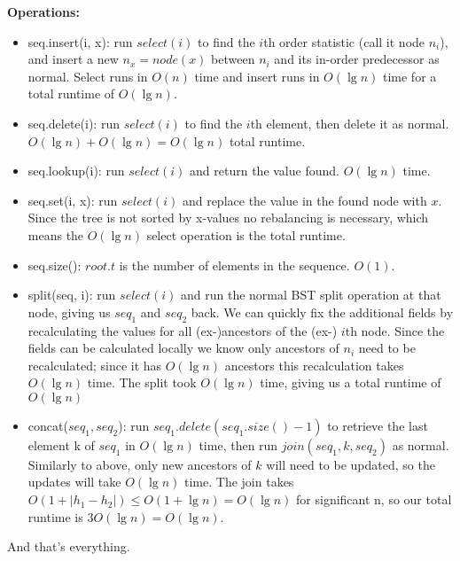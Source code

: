 \documentclass{article}
\renewcommand{\b}[1]{\textbf{#1}}
\begin{document}
\b{Operations:}
\begin{itemize}
  \item seq.insert(i, x): run $select(i)$ to find the $i$th order statistic (call it node $n_i$), and insert a new $n_x = node(x)$ between $n_i$ and its in-order predecessor as normal. Select runs in $O(n)$ time and insert runs in $O(\lg n)$ time for a total runtime of $O(\lg n)$.
  \item seq.delete(i): run $select(i)$ to find the $i$th element, then delete it as normal. $O(\lg n) + O(\lg n) = O(\lg n)$ total runtime.
  \item seq.lookup(i): run $select(i)$ and return the value found. $O(\lg n)$ time.
  \item seq.set(i, x): run $select(i)$ and replace the value in the found node with $x$. Since the tree is not sorted by x-values no rebalancing is necessary, which means the $O(\lg n)$ select operation is the total runtime.
  \item seq.size(): $root.t$ is the number of elements in the sequence. $O(1)$.
  \item split(seq, i): run $select(i)$ and run the normal BST split operation at that node, giving us $seq_1$ and $seq_2$ back. We can quickly fix the additional fields by recalculating the values for all (ex-)ancestors of the (ex-) $i$th node. Since the fields can be calculated locally we know only ancestors of $n_i$ need to be recalculated; since it has $O(\lg n)$ ancestors this recalculation takes $O(\lg n)$ time. The split took $O(\lg n)$ time, giving us a total runtime of $O(\lg n)$
  \item concat($seq_1, seq_2$): run $seq_1.delete(seq_1.size() - 1)$ to retrieve the last element k of $seq_1$ in $O(\lg n)$ time, then run $join(seq_1, k, seq_2)$ as normal. Similarly to above, only new ancestors of $k$ will need to be updated, so the updates will take $O(\lg n)$ time. The join takes $O(1 + |h_1 - h_2|) \le O(1 + \lg n) = O(\lg n)$ for significant n, so our total runtime is $3O(\lg n) = O(\lg n)$.
\end{itemize}
And that's everything. 
\end{document}
